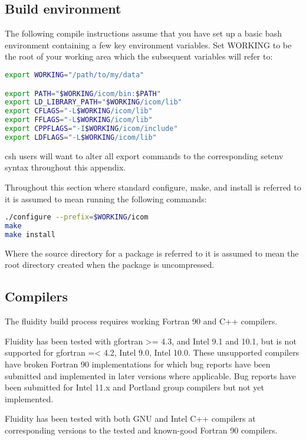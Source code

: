\subsection{Build environment}
\label{sect:required_libraries_build_environment}

The following compile instructions assume that you have set up a basic bash
environment containing a few key environment variables. Set WORKING to be the
root of your working area which the subsequent variables will refer to:

\begin{lstlisting}[language=bash]
export WORKING="/path/to/my/data"

export PATH="$WORKING/icom/bin:$PATH"
export LD_LIBRARY_PATH="$WORKING/icom/lib"
export CFLAGS="-L$WORKING/icom/lib"
export FFLAGS="-L$WORKING/icom/lib"
export CPPFLAGS="-I$WORKING/icom/include"
export LDFLAGS="-L$WORKING/icom/lib"
\end{lstlisting}

csh users will want to alter all export commands to the corresponding setenv
syntax throughout this appendix.

Throughout this section where standard configure, make, and install is referred
to it is assumed to mean running the following commands:

\begin{lstlisting}[language=bash]
./configure --prefix=$WORKING/icom
make
make install
\end{lstlisting}

Where the source directory for a package is referred to it is assumed to mean
the root directory created when the package is uncompressed.

\subsection{Compilers}
\label{sect:required_libraries_compilers}

The fluidity build process requires working Fortran 90 and C++ compilers.

Fluidity has been tested with gfortran >= 4.3, and Intel 9.1 and 10.1, but is
not supported for gfortran =< 4.2, Intel 9.0, Intel 10.0. These unsupported
compilers have broken Fortran 90 implementations for which bug reports have
been submitted and implemented in later versions where applicable. Bug reports
have been submitted for Intel 11.x and Portland group compilers but not yet
implemented.

Fluidity has been tested with both GNU and Intel C++ compilers at corresponding
versions to the tested and known-good Fortran 90 compilers.


